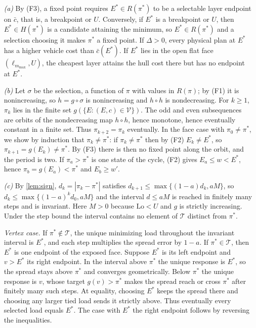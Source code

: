 \emph{(a)} By (F3), a fixed point requires $E^*\in R(\pi^*)$ to be a selectable
layer endpoint on $\bar c$, that is, a breakpoint or $U$. Conversely, if $E^*$ is
a breakpoint or $U$, then $E^*\in H(\pi^*)$ is a candidate attaining the minimum, so
$E^*\in R(\pi^*)$ and a selection choosing it makes $\pi^*$ a fixed point. If
$\Delta>0$, every physical plan at $E^*$ has a higher vehicle cost than
$\bar c(E^*)$. If $E^*$ lies in the open flat face $(\ell_{m_{\max}},U)$,
the cheapest layer attains the hull cost there but has no endpoint at $E^*$.

\emph{(b)} Let $\sigma$ be the selection, a function of $\pi$ with values in
$R(\pi)$; by (F1) it is nonincreasing, so $h=g\circ\sigma$ is nonincreasing and
$h\circ h$ is nondecreasing. For $k\ge1$, $\pi_k$ lies in the finite set
$g(\{E:(E,c)\in\mathcal V\})$. The odd and even subsequences are orbits of the
nondecreasing map $h\circ h$, hence monotone, hence eventually constant in a finite
set. Thus $\pi_{k+2}=\pi_k$ eventually. In the face case with $\pi_0\neq\pi^*$, we
show by induction that $\pi_k\ne\pi^*$: if $\pi_k\neq\pi^*$ then by (F2)
$E_k\ne E^*$, so $\pi_{k+1}=g(E_k)\ne\pi^*$. By (F3) there is then no fixed
point along the orbit, and the period is two. If $\pi_a>\pi^*$ is one state of the
cycle, (F2) gives $E_a\le w<E^*$, hence $\pi_b=g(E_a)<\pi^*$ and $E_b\ge w'$.

\emph{(c)} By \cref{lem:sign}, $d_k=|\pi_k-\pi^*|$ satisfies
$d_{k+1}\le\max\{(1-a)d_k,aM\}$, so $d_k\le\max\{(1-a)^kd_0,aM\}$ and the
interval $d\le aM$ is reached in finitely many steps and is invariant.
Here $M>0$ because $\mathrm{Lo}<U$ and $g$ is strictly increasing. Under
the step bound the interval contains no element of $\mathcal T$ distinct
from $\pi^*$.

\emph{Vertex case.} If $\pi^*\notin\mathcal T$, the unique minimizing load
throughout the invariant interval is $E^*$, and each step multiplies the
spread error by $1-a$. If $\pi^*\in\mathcal T$, then $E^*$ is one endpoint
of the exposed face. Suppose $E^*$ is its left endpoint and $v>E^*$ its
right endpoint. In the interval above $\pi^*$ the unique response is $E^*$,
so the spread stays above $\pi^*$ and converges geometrically. Below
$\pi^*$ the unique response is $v$, whose target $g(v)>\pi^*$ makes the
spread reach or cross $\pi^*$ after finitely many such steps. At equality,
choosing $E^*$ keeps the spread there and choosing any larger tied load
sends it strictly above. Thus eventually every selected load equals $E^*$.
The case with $E^*$ the right endpoint follows by reversing the inequalities.

